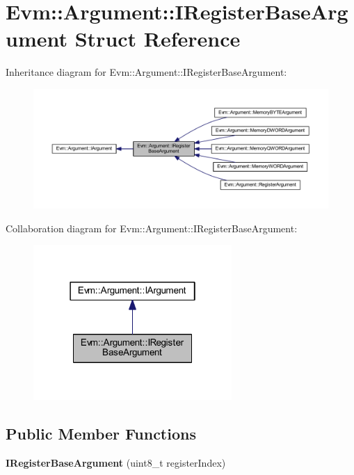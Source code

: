 \hypertarget{struct_evm_1_1_argument_1_1_i_register_base_argument}{}\section{Evm\+:\+:Argument\+:\+:I\+Register\+Base\+Argument Struct Reference}
\label{struct_evm_1_1_argument_1_1_i_register_base_argument}


Inheritance diagram for Evm\+:\+:Argument\+:\+:I\+Register\+Base\+Argument\+:
\nopagebreak
\begin{figure}[H]
\begin{center}
\leavevmode
\includegraphics[width=350pt]{struct_evm_1_1_argument_1_1_i_register_base_argument__inherit__graph}
\end{center}
\end{figure}


Collaboration diagram for Evm\+:\+:Argument\+:\+:I\+Register\+Base\+Argument\+:
\nopagebreak
\begin{figure}[H]
\begin{center}
\leavevmode
\includegraphics[width=214pt]{struct_evm_1_1_argument_1_1_i_register_base_argument__coll__graph}
\end{center}
\end{figure}
\subsection*{Public Member Functions}
\begin{DoxyCompactItemize}
\item 
\mbox{\label{struct_evm_1_1_argument_1_1_i_register_base_argument_aa3dfe476b956a51bb26409c1d8763e21}} 
{\bfseries I\+Register\+Base\+Argument} (uint8\+\_\+t register\+Index)
\end{DoxyCompactItemize}
